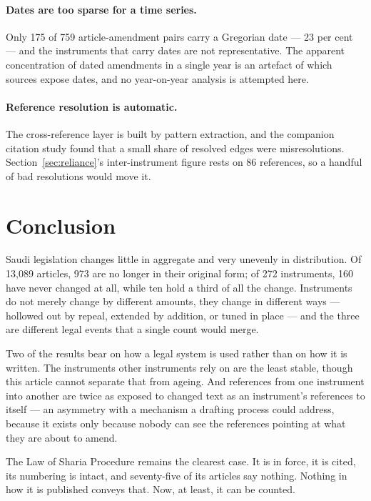 \documentclass[11pt]{article}
\begin{document}
\paragraph{Dates are too sparse for a time series.} Only 175 of 759
article-amendment pairs carry a Gregorian date --- 23 per cent --- and the instruments that carry
dates are not representative. The apparent concentration of dated amendments in
a single year is an artefact of which sources expose dates, and no
year-on-year analysis is attempted here.

\paragraph{Reference resolution is automatic.} The cross-reference layer is
built by pattern extraction, and the companion citation study found that a
small share of resolved edges were misresolutions. Section~\ref{sec:reliance}'s
inter-instrument figure rests on 86 references, so a handful of bad
resolutions would move it.

\section{Conclusion}

Saudi legislation changes little in aggregate and very unevenly in
distribution. Of 13,089 articles, 973 are no longer in their original form; of
272 instruments, 160 have never changed at all, while ten hold a third of all
the change. Instruments do not merely change by different amounts, they change
in different ways --- hollowed out by repeal, extended by addition, or tuned in
place --- and the three are different legal events that a single count would
merge.

Two of the results bear on how a legal system is used rather than on how it is
written. The instruments other instruments rely on are the least stable, though
this article cannot separate that from ageing. And references from one
instrument into another are twice as exposed to changed text as an
instrument's references to itself --- an asymmetry with a mechanism a drafting
process could address, because it exists only because nobody can see the
references pointing at what they are about to amend.

The Law of Sharia Procedure remains the clearest case. It is in force, it is
cited, its numbering is intact, and seventy-five of its articles say nothing.
Nothing in how it is published conveys that. Now, at least, it can be counted.
\end{document}
